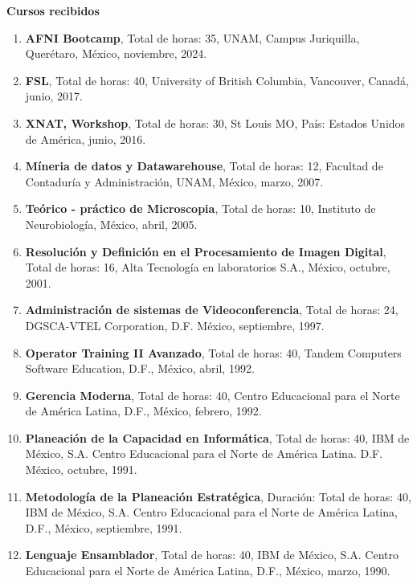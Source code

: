 {\large {\textbf{Cursos recibidos}}

\begin{enumerate}
\item \textbf{AFNI Bootcamp}, Total de horas: 35, UNAM, Campus Juriquilla, 
Querétaro, México, noviembre, 2024.

\item \textbf{FSL}, Total de horas: 40, University of British Columbia, 
Vancouver, Canadá, junio, 2017.

\item  \textbf{XNAT, Workshop}, Total de
horas: 30, St Louis MO, País: Estados Unidos de América, junio, 2016.

\item  \textbf{Míneria de datos y Datawarehouse}, Total de horas: 12, 
Facultad 
de Contaduría y Administración, UNAM, México, marzo, 2007.

\item  \textbf{Teórico - práctico de Microscopia}, Total de horas: 10, 
Instituto de Neurobiología, México, abril, 2005.

\item  \textbf{Resolución y Definición en el Procesamiento de Imagen Digital}, Total de horas: 16, Alta Tecnología en 
laboratorios S.A., 
México, octubre, 2001.

\item  \textbf{Administración de sistemas de Videoconferencia}, Total de 
horas: 24, DGSCA-VTEL Corporation, D.F. México, septiembre, 1997.

\item  \textbf{Operator Training II Avanzado}, Total de horas: 40, 
Tandem 
Computers Software Education, D.F., México, abril, 1992.

\item  \textbf{Gerencia Moderna}, Total de horas: 40, Centro Educacional 
para el Norte de América Latina, D.F., México, febrero, 1992.

\item  \textbf{Planeación de la Capacidad en Informática}, Total de 
horas: 
40, IBM de México, S.A. Centro Educacional para el Norte de América Latina. D.F. México, octubre, 1991.

\item  \textbf{Metodología de la Planeación Estratégica}, Duración: Total de 
horas: 
40, IBM de México, S.A. Centro Educacional para el Norte de América Latina, D.F., México, 
septiembre, 1991.

\item  \textbf{Lenguaje Ensamblador}, Total de horas: 40, IBM de México, 
S.A. Centro Educacional para el Norte de América Latina, D.F., México, marzo, 1990.


\end{enumerate}}
